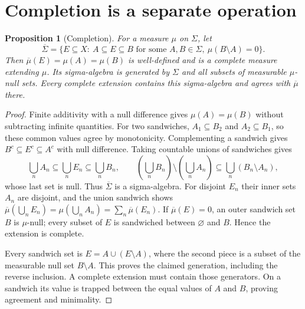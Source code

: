 \documentclass[11pt,oneside,openany]{book}
\newtheorem{proposition}[theorem]{Proposition}
\theoremstyle{definition}
\theoremstyle{remark}
\newcommand{\family}[1]{}
\begin{document}
\section{Completion is a separate operation}

\begin{proposition}[Completion]
\family{D11.02.completion}\label{d11:02:completion}
For a measure $\mu$ on $\Sigma$, let
\[
 \overline\Sigma=\{E\subseteq X:\ A\subseteq E\subseteq B
       \text{ for some }A,B\in\Sigma,\ \mu(B\setminus A)=0\}.
\]
Then $\overline\mu(E)=\mu(A)=\mu(B)$ is well-defined and is a complete
measure extending $\mu$. Its sigma-algebra is generated by $\Sigma$ and all
subsets of measurable $\mu$-null sets. Every complete extension contains
this sigma-algebra and agrees with $\overline\mu$ there.
\end{proposition}
\begin{proof}
Finite additivity with a null difference gives $\mu(A)=\mu(B)$ without
subtracting infinite quantities. For two sandwiches, $A_1\subseteq B_2$
and $A_2\subseteq B_1$, so these common values agree by monotonicity.
Complementing a sandwich gives
$B^c\subseteq E^c\subseteq A^c$ with null difference. Taking countable
unions of sandwiches gives
\[
 \bigcup_n A_n\subseteq\bigcup_n E_n\subseteq\bigcup_n B_n,
 \qquad
 (\bigcup_nB_n)\setminus(\bigcup_nA_n)
       \subseteq\bigcup_n(B_n\setminus A_n),
\]
whose last set is null. Thus $\overline\Sigma$ is a sigma-algebra.
For disjoint $E_n$ their inner sets $A_n$ are disjoint, and the union
sandwich shows
$\overline\mu(\bigcup_nE_n)=\mu(\bigcup_nA_n)=\sum_n\overline\mu(E_n)$.
If $\overline\mu(E)=0$, an outer sandwich set $B$ is $\mu$-null;
every subset of $E$ is sandwiched between $\varnothing$ and $B$.
Hence the extension is complete.

Every sandwich set is $E=A\cup(E\setminus A)$, where the second piece is a
subset of the measurable null set $B\setminus A$. This proves the claimed
generation, including the reverse inclusion. A complete extension must
contain those generators. On a sandwich its value is trapped between the
equal values of $A$ and $B$, proving agreement and minimality.
\end{proof}
\end{document}
